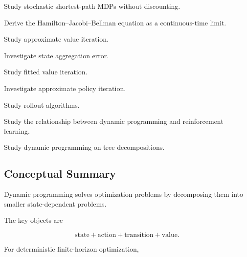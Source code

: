 \begin{exercise}[4]
Study stochastic shortest-path MDPs without discounting.
\end{exercise}

\begin{exercise}[4]
Derive the Hamilton--Jacobi--Bellman equation as a continuous-time limit.
\end{exercise}

\begin{exercise}[4]
Study approximate value iteration.
\end{exercise}

\begin{exercise}[4]
Investigate state aggregation error.
\end{exercise}

\begin{exercise}[4]
Study fitted value iteration.
\end{exercise}

\begin{exercise}[4]
Investigate approximate policy iteration.
\end{exercise}

\begin{exercise}[4]
Study rollout algorithms.
\end{exercise}

\begin{exercise}[4]
Study the relationship between dynamic programming and reinforcement
learning.
\end{exercise}

\begin{exercise}[4]
Study dynamic programming on tree decompositions.
\end{exercise}

\subsection{Conceptual Summary}
\label{subsec:dynamic-programming-summary}

Dynamic programming solves optimization problems by decomposing them into
smaller state-dependent problems.

The key objects are

\[
\boxed{
\text{state}
+
\text{action}
+
\text{transition}
+
\text{value}.
}
\]

For deterministic finite-horizon optimization,

